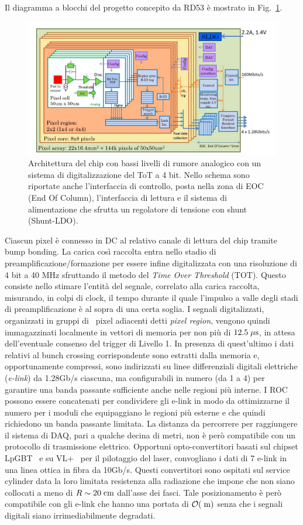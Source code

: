 Il diagramma a blocchi del progetto concepito da RD53 è mostrato in Fig.~\ref{ChipBlockDiagram}. 
\begin{figure}
\centering
\includegraphics[scale=0.4]{Immagini/ChipBlockDiagram}
\caption{Architettura del chip con bassi livelli di rumore analogico con un sistema di digitalizzazione del ToT a 4 bit. Nello schema sono riportate anche l'interfaccia di controllo, posta nella zona di EOC (End Of Column), l'interfaccia di lettura e il sistema di alimentazione che sfrutta un regolatore di tensione con shunt (Shunt-LDO).}
\label{ChipBlockDiagram}
\end{figure}
Ciascun pixel \`e connesso in DC al relativo canale di lettura del chip tramite bump bonding. La carica cos\`i raccolta entra nello stadio di preamplificazione/formazione per essere infine digitalizzata con una risoluzione di 4 bit a 40 MHz sfruttando il metodo del {\em Time Over Threshold} (TOT). Questo consiste nello stimare l'entit\`a del segnale, correlato alla carica raccolta, misurando, in colpi di clock, il tempo durante il quale l'impulso a valle degli stadi di preamplificazione è al sopra di una certa soglia. I segnali digitalizzati, organizzati in gruppi di \moddd\ pixel adiacenti detti {\em pixel region}, vengono quindi immagazzinati localmente in vettori di memoria per non pi\`u di $12.5\; \mu \rm s$, in attesa dell'eventuale consenso del trigger di Livello 1. In presenza di quest'ultimo i dati relativi al bunch crossing corrispondente sono estratti dalla memoria e, opportunamente compressi, sono indirizzati su linee differenziali digitali elettriche ({\em e-link}) da 1.28Gb/s ciascuna, ma configurabili in numero (da 1 a 4) per garantire una banda passante sufficiente anche nelle regioni pi\`u interne. I ROC possono essere concatenati per condividere gli e-link in modo da ottimizzarne il numero per i moduli che equipaggiano le regioni pi\`u esterne e che quindi richiedono un banda passante limitata. La distanza da percorrere per raggiungere il sistema di DAQ, pari a qualche decina di metri, non \`e per\`o compatibile con un protocollo di trasmissione elettrico. Opportuni opto-convertitori basati sul chipset LpGBT~\cite{LpGBT} e su VL+~\cite{VL} per il pilotaggio del laser, convogliano i dati di 7 e-link in una linea ottica in fibra da 10Gb/s. Questi convertitori sono ospitati sul service cylinder data la loro limitata resistenza alla radiazione che impone che non siano collocati a meno di $R\sim20\rm \; cm$ dall'asse dei fasci. Tale posizionamento \`e per\`o compatibile con gli e-link che hanno una portata di ${\cal O}(\rm \; m)$ senza che i segnali digitali siano irrimediabilmente degradati.
